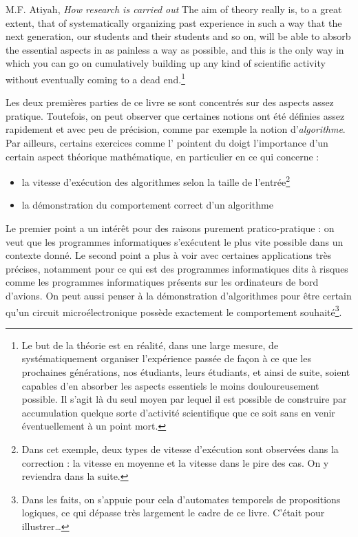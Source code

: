 \documentclass[../../main.tex]{subfiles}
\begin{document}
\begin{chapquote}{M.F. Atiyah, \textit{How research is carried out}}
The aim of theory really is, to a great extent, that
of systematically organizing past experience in
such a way that the next generation, our students
and their students and so on, will be able to
absorb the essential aspects in as painless a way
as possible, and this is the only way in which you
can go on cumulatively building up any kind of
scientific activity without eventually coming to a
dead end.\footnote{Le but de la théorie est en réalité, dans une large mesure, de systématiquement organiser l'expérience passée de façon à ce que les prochaines générations, nos étudiants, leurs étudiants, et ainsi de suite, soient capables d'en absorber les aspects essentiels le moins douloureusement possible. Il s'agit là du seul moyen par lequel il est possible de construire par accumulation quelque sorte d'activité scientifique que ce soit sans en venir éventuellement à un point mort.}
\end{chapquote}
Les deux premières parties de ce livre se sont concentrés sur des aspects assez pratique. Toutefois, on peut observer que certaines notions ont été définies assez rapidement et avec peu de précision, comme par exemple la notion d'\textit{algorithme}. Par ailleurs, certains exercices comme l' pointent du doigt l'importance d'un certain aspect théorique mathématique, en particulier en ce qui concerne :
\begin{itemize}
	\item la vitesse d'exécution des algorithmes selon la taille de l'entrée\footnote{Dans cet exemple, deux types de vitesse d'exécution sont observées dans la correction : la vitesse en moyenne et la vitesse dans le pire des cas. On y reviendra dans la suite.}
	\item la démonstration du comportement correct d'un algorithme
\end{itemize}
Le premier point a un intérêt pour des raisons purement pratico-pratique : on veut que les programmes informatiques s'exécutent le plus vite possible dans un contexte donné. Le second point a plus à voir avec certaines applications très précises, notamment pour ce qui est des programmes informatiques dits \og à risques \fg comme les programmes informatiques présents sur les ordinateurs de bord d'avions. On peut aussi penser à la démonstration d'algorithmes pour être certain qu'un circuit microélectronique possède exactement le comportement souhaité\footnote{Dans les faits, on s'appuie pour cela d'automates temporels de propositions logiques, ce qui dépasse très largement le cadre de ce livre. C'était pour illustrer\dots}.
\end{document}
